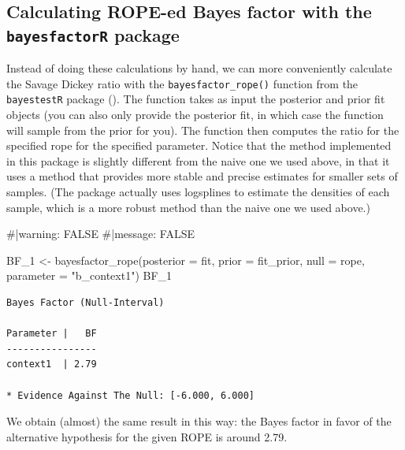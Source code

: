 \documentclass[
  doc,
  floatsintext,
  longtable,
  nolmodern,
  notxfonts,
  notimes,
  colorlinks=true,linkcolor=blue,citecolor=blue,urlcolor=blue]{apa7}
\newenvironment{Shaded}{\begin{snugshade}}{\end{snugshade}}
\newcommand{\AttributeTok}[1]{\textcolor[rgb]{0.40,0.45,0.13}{#1}}
\newcommand{\CommentTok}[1]{\textcolor[rgb]{0.37,0.37,0.37}{#1}}
\newcommand{\FunctionTok}[1]{\textcolor[rgb]{0.28,0.35,0.67}{#1}}
\newcommand{\NormalTok}[1]{\textcolor[rgb]{0.00,0.23,0.31}{#1}}
\newcommand{\OtherTok}[1]{\textcolor[rgb]{0.00,0.23,0.31}{#1}}
\newcommand{\StringTok}[1]{\textcolor[rgb]{0.13,0.47,0.30}{#1}}
\begin{document}
\subsection{\texorpdfstring{Calculating ROPE-ed Bayes factor with the
\texttt{bayesfactorR}
package}{Calculating ROPE-ed Bayes factor with the bayesfactorR package}}\label{calculating-rope-ed-bayes-factor-with-the-bayesfactorr-package}

Instead of doing these calculations by hand, we can more conveniently
calculate the Savage Dickey ratio with the \texttt{bayesfactor\_rope()}
function from the \texttt{bayestestR} package
(). The function takes as input the posterior and prior fit objects
(you can also only provide the posterior fit, in which case the function
will sample from the prior for you). The function then computes the
ratio for the specified rope for the specified parameter. Notice that
the method implemented in this package is slightly different from the
naive one we used above, in that it uses a method that provides more
stable and precise estimates for smaller sets of samples. (The package
actually uses logsplines to estimate the densities of each sample, which
is a more robust method than the naive one we used above.)

\begin{Shaded}
\begin{Highlighting}[]
\CommentTok{\#|warning: FALSE}
\CommentTok{\#|message: FALSE}

\NormalTok{BF\_1 }\OtherTok{\textless{}{-}} \FunctionTok{bayesfactor\_rope}\NormalTok{(}\AttributeTok{posterior =}\NormalTok{ fit, }
                         \AttributeTok{prior =}\NormalTok{ fit\_prior,}
                         \AttributeTok{null =}\NormalTok{ rope, }
                         \AttributeTok{parameter =} \StringTok{"b\_context1"}\NormalTok{)}
\NormalTok{BF\_1}
\end{Highlighting}
\end{Shaded}

\begin{verbatim}
Bayes Factor (Null-Interval)

Parameter |   BF
----------------
context1  | 2.79

* Evidence Against The Null: [-6.000, 6.000]
\end{verbatim}

We obtain (almost) the same result in this way: the Bayes factor in
favor of the alternative hypothesis for the given ROPE is around 2.79.
\end{document}
